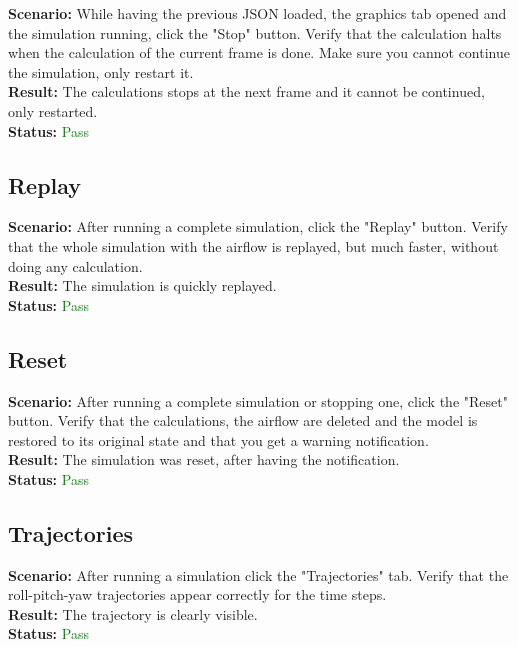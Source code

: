 \documentclass[a4paper, 11pt, article]{report}
\begin{document}
\noindent \textbf{Scenario:} While having the previous JSON loaded, the graphics tab opened and the simulation running, click the "Stop" button. Verify that the calculation halts when the calculation of the current frame is done. Make sure you cannot continue the simulation, only restart it.
\\
\noindent \textbf{Result:} The calculations stops at the next frame and it cannot be continued, only restarted.
\\
\noindent \textbf{Status:} \textcolor{green}{Pass}

\subsection{Replay}

\noindent \textbf{Scenario:} After running a complete simulation, click the "Replay" button. Verify that the whole simulation with the airflow is replayed, but much faster, without doing any calculation.
\\
\noindent \textbf{Result:} The simulation is quickly replayed.
\\
\noindent \textbf{Status:} \textcolor{green}{Pass}

\subsection{Reset}

\noindent \textbf{Scenario:} After running a complete simulation or stopping one, click the "Reset" button. Verify that the calculations, the airflow are deleted and the model is restored to its original state and that you get a warning notification.
\\
\noindent \textbf{Result:} The simulation was reset, after having the notification.
\\
\noindent \textbf{Status:} \textcolor{green}{Pass}

\subsection{Trajectories}

\noindent \textbf{Scenario:} After running a simulation click the "Trajectories" tab. Verify that the roll-pitch-yaw trajectories appear correctly for the time steps.
\\
\noindent \textbf{Result:} The trajectory is clearly visible.
\\
\noindent \textbf{Status:} \textcolor{green}{Pass}
\end{document}

